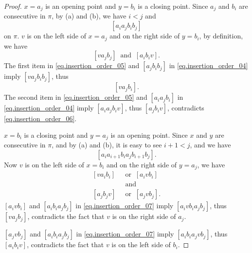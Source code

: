 \documentclass[12pt]{article}
\begin{document}
\begin{proof}
 $x=a_j$ is an opening point and $y=b_i$ is a closing point.
 Since $a_j$ and $b_i$ are consecutive in $\pi$, by (a) and (b), we have $i<j$ and
\begin{equation}\label{eq.insertion_order_04}
[a_i a_{j} b_i b_{j}]
\end{equation}
on $\pi$.
$v$ is on the left side of $x=a_j$ and on the right side of $y=b_i$,
by definition, we have
\begin{equation}\label{eq.insertion_order_05}
[v a_j b_j] \;\; \mbox{and} \;\; [a_ib_iv].
\end{equation}
The first item in \eqref{eq.insertion_order_05} 
and $[a_jb_ib_j]$ in \eqref{eq.insertion_order_04}
imply $[v a_j b_i b_j]$, thus
\begin{equation}\label{eq.insertion_order_06}
[va_jb_i].
\end{equation}
The second item in \eqref{eq.insertion_order_05} 
and $[a_ia_jb_i]$ in \eqref{eq.insertion_order_04}
imply $[a_i a_j b_i v]$, thus $[a_jb_iv]$,
contradicts \eqref{eq.insertion_order_06}.

 $x=b_i$ is a closing point and $y=a_j$ is an opening point.
 Since $x$ and $y$ are consecutive in $\pi$, and by (a) and (b),
 it is easy to see $i+1<j$, and we have
\begin{equation}\label{eq.insertion_order_07}
[a_i a_{i+1} b_i a_j b_{i+1} b_j].
\end{equation}
Now $v$ is on the left side of $x=b_i$ and on the right side of $y = a_j$,
we have
\begin{equation}\label{eq.insertion_order_08}
\begin{split}
[va_ib_i] \;\; & \mbox{or} \;\; [a_ivb_i] \\
& \mbox {and} \\
[a_jb_jv] \;\; & \mbox{or} \;\; [a_jvb_j].
\end{split}
\end{equation}
$[a_i v b_i]$ and $[a_i b_i a_j b_j]$ in \eqref{eq.insertion_order_07}
imply $[a_i v b_i a_j b_j]$, 
thus $[va_jb_j]$, contradicts the fact that $v$ is on the right side of $a_j$.

$[a_j v b_j]$ and $[a_i b_i a_j b_j]$ in \eqref{eq.insertion_order_07}
imply $[a_i b_i a_j v b_j]$, 
thus $[a_ib_iv]$, contradicts the fact that $v$ is on the left side of $b_i$.


\end{proof}
\end{document}
